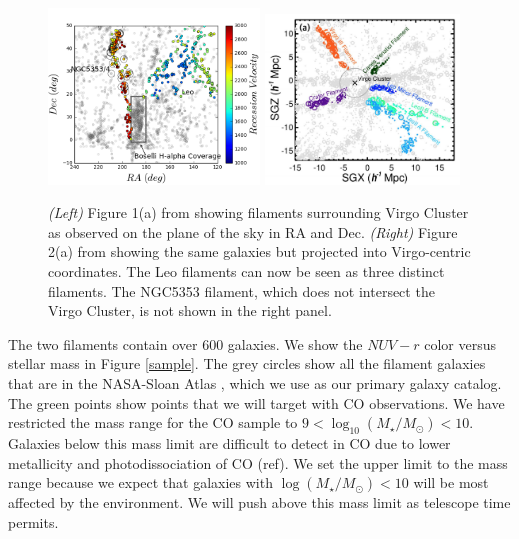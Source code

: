 \documentclass[12pt, preprint]{aastex}
\begin{document}
\begin{figure}[h]
\centering
\includegraphics[width=0.5\textwidth]{filaments.png}
\includegraphics[width=0.46\textwidth]{KimFig2a.png}
\caption{\small {\it (Left)} Figure 1(a) from \citet{kim16} showing filaments
  surrounding Virgo Cluster as observed on the plane of the sky in RA and Dec.  {\it (Right)} Figure
  2(a) from \citet{kim16} showing the same galaxies but projected into
Virgo-centric coordinates.  The Leo filaments can now be seen as three
distinct filaments.  The NGC5353 filament, which does not intersect
the Virgo Cluster, is not shown in the right panel.}
\label{kimfigure}
\end{figure}



The two filaments contain over 600 galaxies.  
We show the $NUV-r$ color versus stellar mass in Figure \ref{sample}.
The grey circles show all the filament galaxies that are in the
NASA-Sloan Atlas \citep{blanton05}, which we use as our primary galaxy
catalog.  The green points show points
that we will target with CO observations.  We have restricted the mass
range for the CO sample to $9 < \log_{10} (M_\star/M_\odot) < 10$.
Galaxies below this mass limit are difficult to detect in CO due
to lower metallicity and photodissociation of CO (ref).  We set the
upper limit to the mass range because we expect that galaxies with
$\log (M_\star/M_\odot) < 10$ will be most affected by the
environment.  We will push above this mass limit as telescope time
permits.
\end{document}
